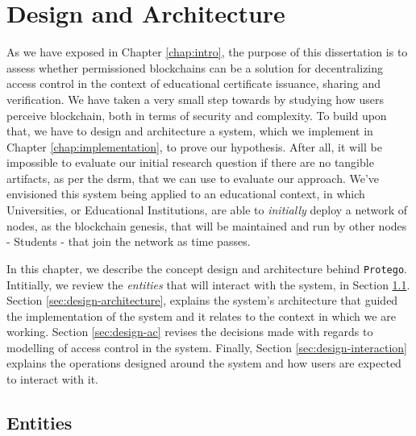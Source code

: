\chapter{Design and Architecture}
\label{chap:design}

As we have exposed in Chapter \ref{chap:intro}, the purpose of this dissertation is to assess whether permissioned blockchains can be a solution for decentralizing access control in the context of educational certificate issuance, sharing and verification. We have taken a very small step towards by studying how users perceive blockchain, both in terms of security and complexity. To build upon that, we have to design and architecture a system, which we implement in Chapter \ref{chap:implementation}, to prove our hypothesis. After all, it will be impossible to evaluate our initial research question if there are no tangible artifacts, as per the \gls{dsrm}, that we can use to evaluate our approach. We've envisioned this system being applied to an educational context, in which Universities, or Educational Institutions, are able to \textit{initially} deploy a network of nodes, as the blockchain genesis, that will be maintained and run by other nodes - Students - that join the network as time passes.

In this chapter, we describe the concept design and architecture behind \texttt{Protego}. Intitially, we review the \textit{entities} that will interact with the system, in Section \ref{sec:design-entities}. Section \ref{sec:design-architecture}, explains the system's architecture that guided the implementation of the system and it relates to the context in which we are working. Section \ref{sec:design-ac} revises the decisions made with regards to modelling of access control in the system. Finally, Section \ref{sec:design-interaction} explains the operations designed around the system and how users are expected to interact with it.

\section{Entities}
\label{sec:design-entities}

